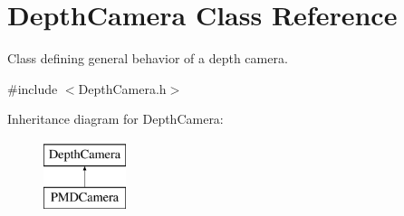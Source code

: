 \hypertarget{class_depth_camera}{}\section{Depth\+Camera Class Reference}
\label{class_depth_camera}


Class defining general behavior of a depth camera.  




{\ttfamily \#include $<$Depth\+Camera.\+h$>$}

Inheritance diagram for Depth\+Camera\+:\begin{figure}[H]
\begin{center}
\leavevmode
\includegraphics[height=2.000000cm]{class_depth_camera}
\end{center}
\end{figure}
